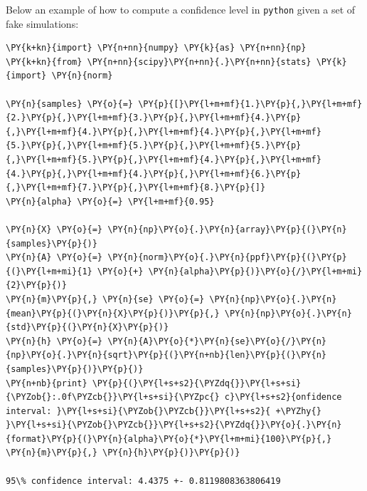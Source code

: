 Below an example of how to compute a confidence level in \texttt{python} given a set of fake simulations:

\begin{tcolorbox}[breakable, size=fbox, boxrule=1pt, pad at break*=1mm,colback=cellbackground, colframe=cellborder]
\begin{Verbatim}[commandchars=\\\{\}]
\PY{k+kn}{import} \PY{n+nn}{numpy} \PY{k}{as} \PY{n+nn}{np}
\PY{k+kn}{from} \PY{n+nn}{scipy}\PY{n+nn}{.}\PY{n+nn}{stats} \PY{k}{import} \PY{n}{norm}

\PY{n}{samples} \PY{o}{=} \PY{p}{[}\PY{l+m+mf}{1.}\PY{p}{,}\PY{l+m+mf}{2.}\PY{p}{,}\PY{l+m+mf}{3.}\PY{p}{,}\PY{l+m+mf}{4.}\PY{p}{,}\PY{l+m+mf}{4.}\PY{p}{,}\PY{l+m+mf}{4.}\PY{p}{,}\PY{l+m+mf}{5.}\PY{p}{,}\PY{l+m+mf}{5.}\PY{p}{,}\PY{l+m+mf}{5.}\PY{p}{,}\PY{l+m+mf}{5.}\PY{p}{,}\PY{l+m+mf}{4.}\PY{p}{,}\PY{l+m+mf}{4.}\PY{p}{,}\PY{l+m+mf}{4.}\PY{p}{,}\PY{l+m+mf}{6.}\PY{p}{,}\PY{l+m+mf}{7.}\PY{p}{,}\PY{l+m+mf}{8.}\PY{p}{]}
\PY{n}{alpha} \PY{o}{=} \PY{l+m+mf}{0.95}

\PY{n}{X} \PY{o}{=} \PY{n}{np}\PY{o}{.}\PY{n}{array}\PY{p}{(}\PY{n}{samples}\PY{p}{)}
\PY{n}{A} \PY{o}{=} \PY{n}{norm}\PY{o}{.}\PY{n}{ppf}\PY{p}{(}\PY{p}{(}\PY{l+m+mi}{1} \PY{o}{+} \PY{n}{alpha}\PY{p}{)}\PY{o}{/}\PY{l+m+mi}{2}\PY{p}{)}
\PY{n}{m}\PY{p}{,} \PY{n}{se} \PY{o}{=} \PY{n}{np}\PY{o}{.}\PY{n}{mean}\PY{p}{(}\PY{n}{X}\PY{p}{)}\PY{p}{,} \PY{n}{np}\PY{o}{.}\PY{n}{std}\PY{p}{(}\PY{n}{X}\PY{p}{)}
\PY{n}{h} \PY{o}{=} \PY{n}{A}\PY{o}{*}\PY{n}{se}\PY{o}{/}\PY{n}{np}\PY{o}{.}\PY{n}{sqrt}\PY{p}{(}\PY{n+nb}{len}\PY{p}{(}\PY{n}{samples}\PY{p}{)}\PY{p}{)}
\PY{n+nb}{print} \PY{p}{(}\PY{l+s+s2}{\PYZdq{}}\PY{l+s+si}{\PYZob{}:.0f\PYZcb{}}\PY{l+s+si}{\PYZpc{} c}\PY{l+s+s2}{onfidence interval: }\PY{l+s+si}{\PYZob{}\PYZcb{}}\PY{l+s+s2}{ +\PYZhy{} }\PY{l+s+si}{\PYZob{}\PYZcb{}}\PY{l+s+s2}{\PYZdq{}}\PY{o}{.}\PY{n}{format}\PY{p}{(}\PY{n}{alpha}\PY{o}{*}\PY{l+m+mi}{100}\PY{p}{,} \PY{n}{m}\PY{p}{,} \PY{n}{h}\PY{p}{)}\PY{p}{)}

95\% confidence interval: 4.4375 +- 0.8119808363806419
\end{Verbatim}
\end{tcolorbox}
